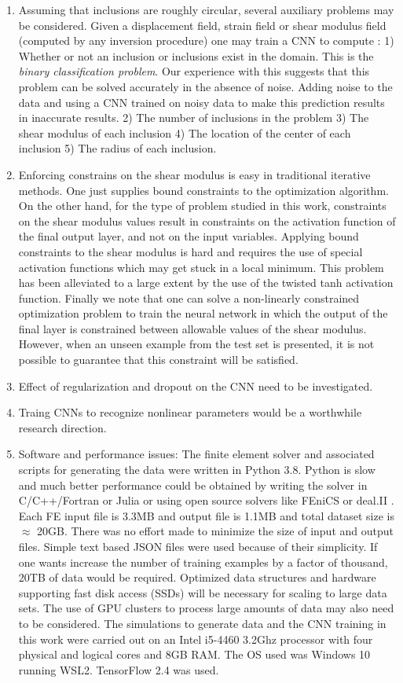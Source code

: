 \documentclass[12pt]{article}
\begin{document}
\begin{enumerate}
\item{Assuming that inclusions are roughly circular, several auxiliary problems may be considered. Given a displacement field, strain field or shear modulus field (computed by any inversion procedure) one may train a CNN to compute : 1) Whether or not an inclusion or inclusions exist  in the domain. This is the \textit{binary classification problem}. Our experience with this suggests that this problem can be solved accurately in the absence of noise.  Adding noise to the data and using a CNN trained on noisy data to make this prediction results in inaccurate results. 2) The number of inclusions in the problem 3) The shear modulus of each inclusion 4) The location of the center of each inclusion 5) The radius of each inclusion.}
\item{Enforcing constrains on the shear modulus is easy in traditional iterative methods. One just supplies bound constraints to the optimization algorithm. On the other hand, for the type of problem studied in this work, constraints on the shear modulus values result in constraints on the activation function of the final output layer, and not on the input variables. Applying bound constraints to the shear modulus is hard and requires the use of special activation functions which may get stuck in a local minimum. This problem has been alleviated to a large extent by the use of the twisted tanh activation function. Finally we note that one can solve a non-linearly constrained optimization problem to train the neural network in which the output of the final layer is constrained between allowable values of the shear modulus. However, when an unseen example from the test set is presented, it is not possible to guarantee that this constraint will be satisfied.}
\item{Effect of regularization and dropout on the CNN need to be investigated.}
\item{Traing CNNs to recognize nonlinear parameters would be a worthwhile research direction.}
\item{Software and performance issues: The finite element solver and associated scripts for generating the data were written in Python 3.8. Python is slow and much better performance could be obtained by writing the solver in C/C++/Fortran or Julia or using open source solvers like FEniCS \cite{paper:fenics} or deal.II \cite{misc:deal.ii}. Each FE input file is 3.3MB and output file is 1.1MB and total dataset size is $\approx$  20GB. There was no effort made to minimize the size of input and output files. Simple text based JSON files were used because of their simplicity. If one wants increase the number of training examples by a factor of thousand, 20TB of data would be required. Optimized data structures and hardware supporting fast disk access (SSDs) will be necessary for scaling to large data sets. The use of GPU clusters to process large amounts of data may also need to be considered. The simulations to generate data and the CNN training in this work were carried out on an Intel i5-4460 3.2Ghz processor with four physical and logical cores and 8GB RAM. The OS used was Windows 10 running WSL2. TensorFlow 2.4 was used.}
\end{enumerate}
\clearpage
{}

\end{document}
